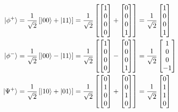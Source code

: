\documentclass{article}
\begin{document}
\begin{align*}
    \begin{split}
        \ket{\phi^+} &= \frac{1}{\sqrt{2}}\left[ \ket{00} + \ket{11}\right] = \frac{1}{\sqrt{2}}\left[\begin{bmatrix} 1 \\ 0 \\ 0 \\ 0 \end{bmatrix} + \begin{bmatrix} 0 \\ 0 \\ 0 \\ 1 \end{bmatrix}\right] = \frac{1}{\sqrt{2}}\begin{bmatrix} 1 \\ 0 \\ 0 \\ 1\end{bmatrix}\\
        \ket{\phi^-} &= \frac{1}{\sqrt{2}}\left[ \ket{00} - \ket{11}\right] = \frac{1}{\sqrt{2}}\left[\begin{bmatrix} 1 \\ 0 \\ 0 \\ 0 \end{bmatrix} - \begin{bmatrix} 0 \\ 0 \\ 0 \\ 1 \end{bmatrix}\right] = \frac{1}{\sqrt{2}}\begin{bmatrix} 1 \\ 0 \\ 0 \\ -1\end{bmatrix}\\
        \ket{\Psi^+} &= \frac{1}{\sqrt{2}}\left[ \ket{10} + \ket{01}\right] = \frac{1}{\sqrt{2}}\left[\begin{bmatrix} 0 \\ 1 \\ 0 \\ 0 \end{bmatrix} + \begin{bmatrix} 0 \\ 0 \\ 1 \\ 0 \end{bmatrix}\right] = \frac{1}{\sqrt{2}}\begin{bmatrix} 0 \\ 1 \\ 1 \\ 0\end{bmatrix}\\

\end{split}
\end{align*}
\end{document}
